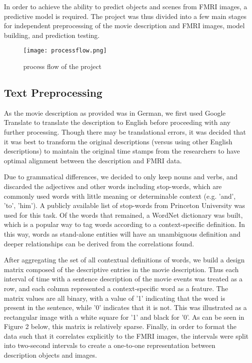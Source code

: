 \par In order to achieve the ability to predict objects and scenes 
from FMRI images, a predictive model is required. The project was thus 
divided into a few main stages for independent preprocessing of the 
movie description and FMRI images, model building, and prediction
testing.

\begin{figure}[!htbp]
\centering
\texttt{[image: processflow.png]}
\caption{\label{fig:processflow} process flow of the project}
\end{figure}

\subsection{Text Preprocessing}
\par As the movie description as provided was in German, we first used Google
Translate to translate the description to English before proceeding with 
any further processing. Though there may be translational errors, it was decided that it was best to transform the original descriptions (versus using other English descriptions) to maintain the original time stamps from the researchers to have optimal alignment between the description and FMRI data.

\par Due to grammatical differences, we decided to only keep nouns and verbs, and discarded the adjectives and other words including stop-words, which are commonly used words with little meaning or determinable context (e.g. 'and', 'to', 'him'). A publicly available list of stop-words from Princeton University was used for this task. Of the words that remained, a WordNet dictionary was built, which is a popular way to tag words according to a context-specific definition. In this way, words as stand-alone entities will have an unambiguous definition and deeper relationships can be derived from the correlations found. 


 \par After aggregating the set of all contextual definitions of words,
 we build a design matrix composed of the descriptive entries in the movie description. Thus each interval of time with a sentence description of the movie events was treated as a row, and each column represented a context-specific word as a feature. The matrix values are all binary, with a value of '1' indicating that the word is present in the sentence, while '0' indicates that it is not. This was illustrated as a rectangular image with a white square for '1' and black for '0'. As can be seen in Figure 2 below, this matrix is relatively sparse. Finally, in order to format the data such that it correlates explicitly
to the FMRI images, the intervals were split into two-second intervals
to create a one-to-one representation between description objects and images.
\clearpage

